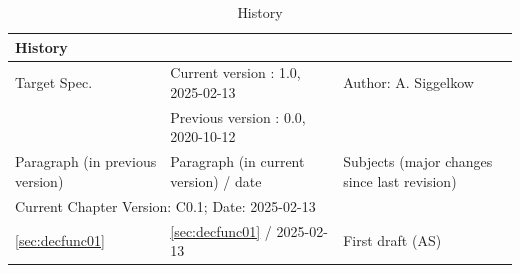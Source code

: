 \begin{table}[H]
\caption{History}
\label{tab:aluhistory02}
\centering
\begin{tabularx}{\textwidth}{|X |X |X |}
  \hline
  \multicolumn{3}{|l|}{History} \\
  \hline
  \multicolumn{1}{|l}{Target Spec.} & \multicolumn{1}{l}{Current version : 1.0, 2025-02-13} & \multicolumn{1}{l|}{Author: A. Siggelkow}\\
  \multicolumn{1}{|l}{ } & \multicolumn{1}{l}{Previous version : 0.0, 2020-10-12} & \multicolumn{1}{l|}{ }\\
  \hline
  \hline
  Paragraph (in previous version) & Paragraph (in current version) / date & Subjects (major changes since last revision) \\
  \hline
  \hline
  \multicolumn{3}{|l|}{Current Chapter Version: C0.1; Date: 2025-02-13} \\
  \hline
  \ref{sec:decfunc01} & \ref{sec:decfunc01} / 2025-02-13 & First draft (AS) \\
  \hline
\end{tabularx}
\end{table}
